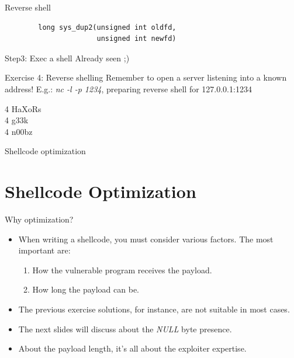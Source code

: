 \begin{frame}{Reverse shell}
	\ccode
	\begin{lstlisting}
		long sys_dup2(unsigned int oldfd,
		              unsigned int newfd)
	\end{lstlisting}

	\begin{block}{Step3: Exec a shell}
		Already seen ;)
	\end{block}

	\begin{block}{Exercise 4: Reverse shelling}
		Remember to open a server listening into a known address! E.g.: \emph{nc -l
		-p 1234}, preparing reverse shell for 127.0.0.1:1234
		\begin{description}
			\item[4 HaXoRs]
			\item[4 g33k]
			\item[4 n00bz]
		\end{description}
	\end{block}

\end{frame}

\begin{frame}{Shellcode optimization}
	\section{Shellcode Optimization}
	\begin{block}{Why optimization?}
		\begin{itemize}
			\item When writing a shellcode, you must consider various factors. The
				most important are:
				\begin{enumerate}
					\item How the vulnerable program receives the payload.
					\item How long the payload can be.
				\end{enumerate}
			\item The previous exercise solutions, for instance, are not suitable in most cases.
			\item The next slides will discuss about the \emph{NULL} byte presence.
			\item About the payload length, it's all about the exploiter expertise.
		\end{itemize}
	\end{block}
\end{frame}

